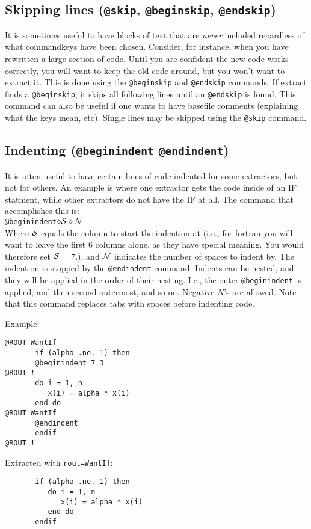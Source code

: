 \subsection{Skipping lines ({\tt @skip}, {\tt @beginskip}, {\tt @endskip})}
It is sometimes useful to have blocks of text that are {\em never} included
regardless of what commandkeys have been chosen.  Consider, for instance,
when you have rewritten a large section of code.  Until you are confident
the new code works correctly, you will want to keep the old code around,
but you won't want to extract it.  This is done using the 
{\tt @beginskip} and {\tt @endskip} commands.  
If extract finds a {\tt @beginskip},
it skips all following lines until an {\tt @endskip} is found.  This command
can also be useful if one wants to have basefile comments (explaining
what the keys mean, etc).
Single lines may be skipped using the {\tt @skip} command.

\subsection{Indenting ({\tt @beginindent} {\tt @endindent})}
\label{sec-indent}
It is often useful to have certain lines of code indented for some
extractors, but not for others.  An example is where one extractor
gets the code inside of an IF statment, while other extractors do
not have the IF at all.  The command that accomplishes this is:\\
{\tt @beginindent$\diamond\cal S\diamond N$}\\
Where $\cal S$ equals the column to start the indention at (i.e., for
fortran you will want to leave the first 6 columns alone, as they have
special meaning.  You would therefore set $\cal S$$= 7$.), and
$\cal N$ indicates the number of spaces to indent by.  The indention
is stopped by the {\tt @endindent} command.  Indents can be nested, and they
will be applied in the order of their nesting.  I.e., the outer 
{\tt @beginindent} is applied, and then second outermost, and so on.
Negative {\tt $N$}'s are allowed.
Note that this command replaces tabs with spaces before indenting code.

\noindent
Example:
\begin{verbatim}
@ROUT WantIf
       if (alpha .ne. 1) then
       @beginindent 7 3
@ROUT !
       do i = 1, n
          x(i) = alpha * x(i)
       end do
@ROUT WantIf
       @endindent
       endif
@ROUT !
\end{verbatim}

\noindent
Extracted with {\tt rout=WantIf}:
\begin{verbatim}
       if (alpha .ne. 1) then
          do i = 1, n
             x(i) = alpha * x(i)
          end do
       endif
\end{verbatim}

